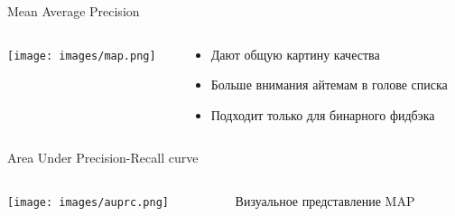\documentclass[11pt,aspectratio=169,handout]{beamer}
\begin{document}
\begin{frame}{Mean Average Precision \cite{MOUSSA}}

\begin{columns}
\begin{column}{0.5\textwidth}
   \begin{center}
		\texttt{[image: images/map.png]}
   \end{center}
\end{column}
\begin{column}{0.4\textwidth}
    \begin{tcolorbox}[colback=info!5,colframe=info!80,title=]
      \begin{itemize}
      \item Дают общую картину качества
      \item Больше внимания айтемам в голове списка
      \end{itemize}
    \end{tcolorbox}
    \begin{tcolorbox}[colback=warn!5,colframe=warn!80,title=]
      \begin{itemize}
      \item Подходит только для бинарного фидбэка
      \end{itemize}
    \end{tcolorbox}
\end{column}
\end{columns}

\end{frame}

\begin{frame}{Area Under Precision-Recall curve}

\begin{columns}
\begin{column}{0.5\textwidth}
   \begin{center}
		\texttt{[image: images/auprc.png]}
   \end{center}
\end{column}
\begin{column}{0.4\textwidth}
    \begin{tcolorbox}[colback=gray!5,colframe=gray!80,title=]
      Визуальное представление MAP
    \end{tcolorbox}
\end{column}
\end{columns}

\end{frame}
\end{document}
